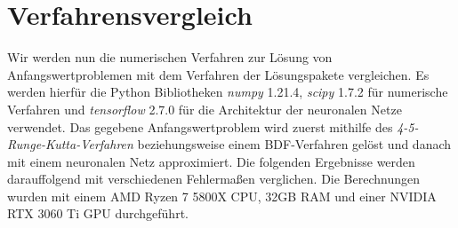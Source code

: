 \section{Verfahrensvergleich}
\label{sec:verfahrensvergleich}
Wir werden nun die numerischen Verfahren zur Lösung von Anfangswertproblemen mit dem Verfahren der Lösungspakete
vergleichen. Es werden hierfür die Python Bibliotheken \textit{numpy} 1.21.4, \textit{scipy} 1.7.2 für numerische
Verfahren und \textit{tensorflow} 2.7.0 für die Architektur der neuronalen Netze verwendet. Das gegebene
Anfangswertproblem wird zuerst mithilfe des \textit{4-5-Runge-Kutta-Verfahren} beziehungsweise einem BDF-Verfahren
gelöst und danach mit einem neuronalen Netz approximiert. Die folgenden Ergebnisse werden darauffolgend mit
verschiedenen Fehlermaßen verglichen. Die Berechnungen wurden mit einem AMD Ryzen 7 5800X CPU, 32GB RAM und einer
NVIDIA RTX 3060 Ti GPU durchgeführt.

